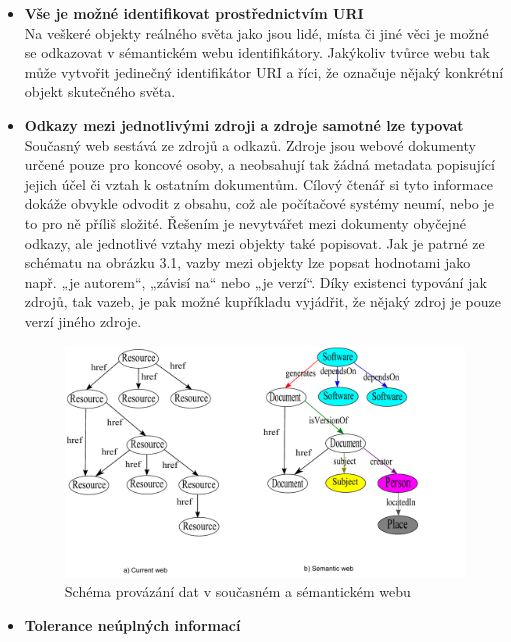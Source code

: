 \documentclass{projekt}
\begin{document}
\begin {itemize}

\item \textbf{Vše je možné identifikovat prostřednictvím URI}\\

\hspace{0.65cm}Na veškeré objekty reálného světa jako jsou lidé, místa či jiné věci je možné se odkazovat v sémantickém webu identifikátory. Jakýkoliv tvůrce webu tak může vytvořit jedinečný identifikátor URI a říci, že označuje nějaký konkrétní objekt skutečného světa. 

\item \textbf{Odkazy mezi jednotlivými zdroji a zdroje samotné lze typovat}\\

\hspace{0.65cm}Současný web sestává ze zdrojů a odkazů. Zdroje jsou webové dokumenty určené pouze pro koncové osoby, a neobsahují tak žádná metadata popisující jejich účel či vztah k ostatním dokumentům. Cílový čtenář si tyto informace dokáže obvykle odvodit z obsahu, což ale počítačové systémy neumí, nebo je to pro ně příliš složité. Řešením je nevytvářet mezi dokumenty obyčejné odkazy, ale jednotlivé vztahy mezi objekty také popisovat. Jak je patrné ze schématu na obrázku 3.1, vazby mezi objekty lze popsat hodnotami jako např. „je autorem“, „závisí na“ nebo „je verzí“. Díky existenci typování jak zdrojů, tak vazeb, je pak možné kupříkladu vyjádřit, že nějaký zdroj je pouze verzí jiného zdroje.

\begin{figure}[htb]
\begin{center}
\includegraphics[scale=0.75]{Schema1.pdf}
\caption{Schéma provázání dat v současném a sémantickém webu \cite{dva}}
\end{center}
\end{figure}
\newpage
\item \textbf{Tolerance neúplných informací }\\


\end{itemize}
\end{document}
